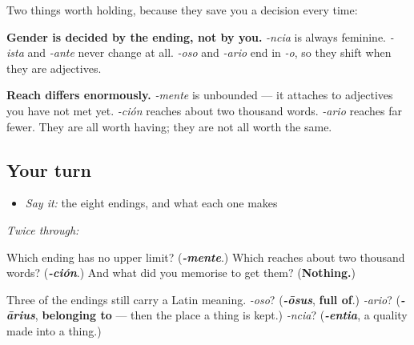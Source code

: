 \begin{grammarlens}[title={Grammar Lens: what each one costs you}]
Two things worth holding, because they save you a decision every time:

\textbf{Gender is decided by the ending, not by you.} \emph{-ncia} is always feminine. \emph{-ista} and \emph{-ante} never change at all. \emph{-oso} and \emph{-ario} end in \emph{-o}, so they shift when they are adjectives.

\textbf{Reach differs enormously.} \emph{-mente} is unbounded — it attaches to adjectives you have not met yet. \emph{-ción} reaches about two thousand words. \emph{-ario} reaches far fewer. They are all worth having; they are not all worth the same.
\end{grammarlens}

\subsection*{Your turn}
\begin{itemize}
\raggedright
  \item \emph{Say it:} the eight endings, and what each one makes
\end{itemize}

\emph{Twice through:}

\begin{tcolorbox}[breakable,colback=teal!4,colframe=teal!35!black,title={Before you move on}]
Which ending has no upper limit? (\emph{\textbf{-mente}}.) Which reaches about two thousand words? (\emph{\textbf{-ción}}.) And what did you memorise to get them? (\textbf{Nothing.})

Three of the endings still carry a Latin meaning. \emph{-oso}? (\emph{\textbf{-ōsus}}, \textbf{full of}.) \emph{-ario}? (\emph{\textbf{-ārius}}, \textbf{belonging to} — then the place a thing is kept.) \emph{-ncia}? (\emph{\textbf{-entia}}, a quality made into a thing.)
\end{tcolorbox}

